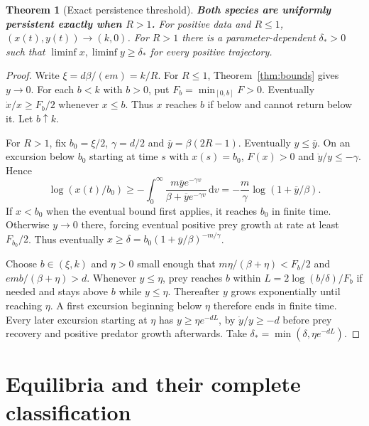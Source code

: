 \documentclass[12pt,a4paper,twoside,fleqn]{article}
\theoremstyle{journal}
\newtheorem{theorem}{Theorem}
\newcommand{\claim}[1]{{\normalfont\bfseries\boldmath #1}}
\newcommand{\dd}{\mathrm{d}}
\begin{document}
\begin{theorem}[Exact persistence threshold]\label{thm:per}
\claim{Both species are uniformly persistent exactly when \(R>1\).} For positive data and \(R\le1\), \((x(t),y(t))\to(k,0)\). For \(R>1\) there is a parameter-dependent \(\delta_*>0\) such that \(\liminf x,\liminf y\ge\delta_*\) for every positive trajectory.
\end{theorem}
\begin{proof}
Write \(\xi=d\beta/(em)=k/R\). For \(R\le1\), Theorem~\ref{thm:bounds} gives \(y\to0\). For each \(b<k\) with \(b>0\), put \(F_b=\min_{[0,b]}F>0\). Eventually \(\dot x/x\ge F_b/2\) whenever \(x\le b\). Thus \(x\) reaches \(b\) if below and cannot return below it. Let \(b\uparrow k\).

For \(R>1\), fix \(b_0=\xi/2\), \(\gamma=d/2\) and \(\overline y=\beta(2R-1)\). Eventually \(y\le\overline y\). On an excursion below \(b_0\) starting at time \(s\) with \(x(s)=b_0\), \(F(x)>0\) and \(\dot y/y\le-\gamma\). Hence
\[
 \log(x(t)/b_0)\ge-\int_0^\infty
 \frac{m\overline y e^{-\gamma v}}{\beta+\overline y e^{-\gamma v}}\,\dd v
 =-\frac{m}{\gamma}\log(1+\overline y/\beta).
\]
If \(x<b_0\) when the eventual bound first applies, it reaches \(b_0\) in finite time. Otherwise \(y\to0\) there, forcing eventual positive prey growth at rate at least \(F_{b_0}/2\). Thus eventually \(x\ge\delta=b_0(1+\overline y/\beta)^{-m/\gamma}\).

Choose \(b\in(\xi,k)\) and \(\eta>0\) small enough that \(m\eta/(\beta+\eta)<F_b/2\) and \(emb/(\beta+\eta)>d\). Whenever \(y\le\eta\), prey reaches \(b\) within \(L=2\log(b/\delta)/F_b\) if needed and stays above \(b\) while \(y\le\eta\). Thereafter \(y\) grows exponentially until reaching \(\eta\). A first excursion beginning below \(\eta\) therefore ends in finite time. Every later excursion starting at \(\eta\) has \(y\ge\eta e^{-dL}\), by \(\dot y/y\ge-d\) before prey recovery and positive predator growth afterwards. Take \(\delta_*=\min(\delta,\eta e^{-dL})\).
\end{proof}

\section{Equilibria and their complete classification}\label{sec:eq}
\end{document}
